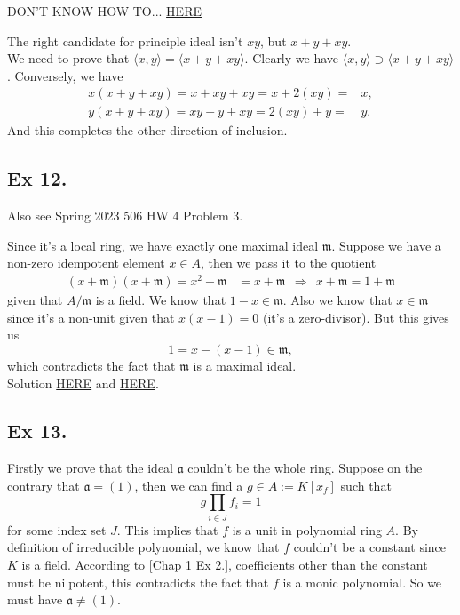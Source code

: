 DON'T KNOW HOW TO... \href{https://math.stackexchange.com/questions/110329/finitely-generated-ideals-in-a-boolean-ring-are-principal-why}{HERE}

The right candidate for principle ideal isn't $xy$, but $x+y+xy$.\\

We need to prove that $\langle x,y\rangle =\langle x+y+xy\rangle$. Clearly we have $\langle x,y\rangle \supset \langle x+y+xy\rangle$. Conversely, we have 
\begin{align*}
    x(x+y+xy)=x+xy+xy=x+2(xy)=&x,\\ y(x+y+xy)=xy+y+xy=2(xy)+y=&y.
\end{align*}
And this completes the other direction of inclusion.

\subsection{Ex 12.}

\vspace{0.2in}Also see Spring 2023 506 HW 4 Problem 3.\vspace{0.2in}

Since it's a local ring, we have exactly one maximal ideal $\mathfrak m$. Suppose we have a non-zero idempotent element $x\in A$, then we pass it to the quotient
\begin{align*}
    (x+\mathfrak m)(x+\mathfrak m)=x^2+\mathfrak m&=x+\mathfrak m
    ~~\Rightarrow~~ x+\mathfrak m=1+\mathfrak m
\end{align*} given that $A/\mathfrak m$ is a field. We know that $1-x\in \mathfrak m$. Also we know that $x\in\mathfrak m$ since it's a non-unit given that $x(x-1)=0$ (it's a zero-divisor). But this gives us 
$$1=x-(x-1)\in \mathfrak m,$$ which contradicts the fact that $\mathfrak m$ is a maximal ideal.\\

Solution \href{https://math.stackexchange.com/questions/3180861/proof-check-idempotents-of-a-local-commutative-ring}{HERE} and \href{https://math.stackexchange.com/questions/725171/idempotents-in-a-local-ring}{HERE}.

\subsection{Ex 13.}

\indent Firstly we prove that the ideal $\mathfrak a$ couldn't be the whole ring. Suppose on the contrary that $\mathfrak a=(1)$, then we can find a $g\in A:=K[x_f]$ such that 
$$g\prod_{i\in J}f_i=1$$ for some index set $J$. This implies that $f$ is a unit in polynomial ring $A$. By definition of irreducible polynomial, we know that $f$ couldn't be a constant since $K$ is a field. According to \ref{Chap 1 Ex 2.}, coefficients other than the constant must be nilpotent, this contradicts the fact that $f$ is a monic polynomial. So we must have $\mathfrak a\neq (1)$.\\

